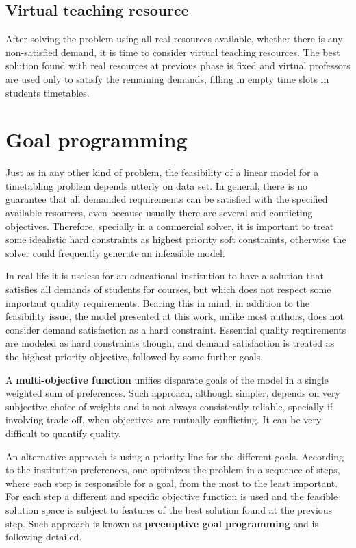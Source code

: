 \subsection{Virtual teaching resource}

After solving the problem using all real resources available, whether there is any non-satisfied demand, it is time to consider virtual teaching resources. The best solution found with real resources at previous phase is fixed and virtual professors are used only to satisfy the remaining demands, filling in empty time slots in students timetables.



\section{Goal programming}

Just as in any other kind of problem, the feasibility of a linear model for a timetabling problem depends utterly on data set. In general, there is no guarantee that all demanded requirements can be satisfied with the specified available resources, even because usually there are several and conflicting objectives. Therefore, specially in a commercial solver, it is important to treat some idealistic hard constraints as highest priority soft constraints, otherwise the solver could frequently generate an infeasible model.

In real life it is useless for an educational institution to have a solution that satisfies all demands of students for courses, but which does not respect some important quality requirements. Bearing this in mind, in addition to the feasibility issue, the model presented at this work, unlike most authors, does not consider demand satisfaction as a hard constraint. Essential quality requirements are modeled as hard constraints though, and demand satisfaction is treated as the highest priority objective, followed by some further goals.

A \textbf{multi-objective function} unifies disparate goals of the model in a single weighted sum of preferences. Such approach, although simpler, depends on very subjective choice of weights and is not always consistently reliable, specially if involving trade-off, when objectives are mutually conflicting. It can be very difficult to quantify quality.

An alternative approach is using a priority line for the different goals. According to the institution preferences, one optimizes the problem in a sequence of steps, where each step is responsible for a goal, from the most to the least important. For each step a different and specific objective function is used and the feasible solution space is subject to features of the best solution found at the previous step. Such approach is known as \textbf{preemptive goal programming} and is following detailed.


